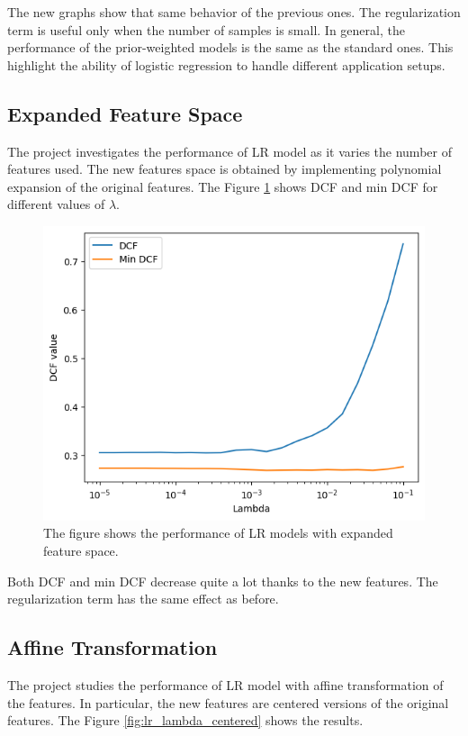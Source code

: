\documentclass{article}
\begin{document}
The new graphs show that same behavior of the previous ones. The regularization term is useful only when the number of samples is small. In general, the performance of the prior-weighted models is the same as the standard ones. This highlight the ability of logistic regression to handle different application setups.

\subsection{Expanded Feature Space}
The project investigates the performance of LR model as it varies the number of features used. The new features space is obtained by implementing polynomial expansion of the original features. The Figure \ref{fig:lr_lambda_quadratic} shows DCF and min DCF for different values of $\lambda$.

\begin{figure}[ht]
    \centering
    \includegraphics[width=\textwidth]{images/lr_lambda_quadratic.png}
    \caption{The figure shows the performance of LR models with expanded feature space.}
    \label{fig:lr_lambda_quadratic}
\end{figure}

Both DCF and min DCF decrease quite a lot thanks to the new features. The regularization term has the same effect as before.

\subsection{Affine Transformation}
The project studies the performance of LR model with affine transformation of the features. In particular, the new features are centered versions of the original features. The Figure \ref{fig:lr_lambda_centered} shows the results.
\end{document}
